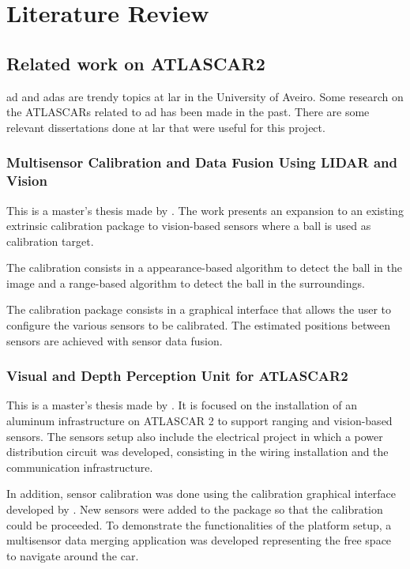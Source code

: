\chapter{Literature Review}

\section{Related work on ATLASCAR2}

\gls{ad} and \gls{adas} are trendy topics at \gls{lar} in the University of Aveiro. Some research on the ATLASCARs related to \gls{ad} has been made in the past. There are some relevant dissertations done at \gls{lar} that were useful for this project. 

\subsection{Multisensor Calibration and Data Fusion Using LIDAR and Vision} 

This is a master's thesis made by \cite{VieiradaSilva2016}. The work presents an expansion to an existing extrinsic calibration package to vision-based sensors where a ball is used as calibration target. 

The calibration consists in a appearance-based algorithm to detect the ball in the image and a range-based algorithm to detect the ball in the surroundings. 

The calibration package consists in a graphical interface that allows the user to configure the various sensors to be calibrated. The estimated positions between sensors are achieved with sensor data fusion.

\subsection{Visual and Depth Perception Unit for ATLASCAR2} 

This is a master's thesis made by \cite{Correia2017}. It is focused on the installation of an aluminum infrastructure on ATLASCAR 2 to support ranging and vision-based sensors. The sensors setup also include the electrical project in which a power distribution circuit was developed, consisting in the wiring installation and the communication infrastructure. 

In addition, sensor calibration was done using the calibration graphical interface developed by \cite{VieiradaSilva2016}. New sensors were added to the package so that the calibration could be proceeded. To demonstrate the functionalities of the platform setup, a multisensor data merging application was developed representing the free space to navigate around the car.


